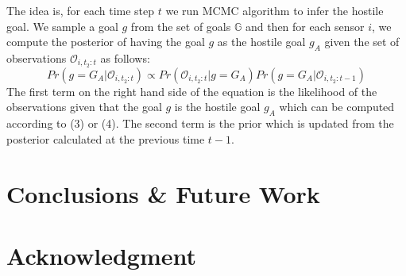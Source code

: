 \documentclass[conference]{IEEEtran}
\begin{document}
The idea is, for each time step $t$ we run MCMC algorithm to infer the hostile goal. We sample a goal $g$ from the set of goals $\mathbb{G}$ and then for each sensor $i$, we compute the posterior of having the goal $g$ as the hostile goal $g_A$ given the set of observations $\mathcal{O}_{i,t_2:t}$ as follows:
\begin{equation} Pr(g=G_A|\mathcal{O}_{i,t_2:t}) \propto Pr(\mathcal{O}_{i,t_2:t} | g = G_A) Pr(g=G_A|\mathcal{O}_{i,t_2:t-1})
\end{equation}
The first term on the right hand side of the equation is the likelihood of the observations given that the goal $g$ is the hostile goal $g_A$ which can be computed according to (3) or (4). The second term is the prior which is updated from the posterior calculated at the previous time $t-1$. 

\section{Conclusions \& Future Work}\label{sec:conclusion}




\section*{Acknowledgment}
\end{document}
